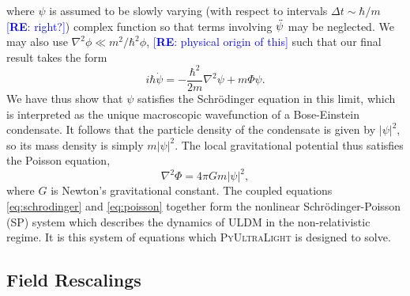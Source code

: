 \documentclass[a4paper,11pt]{article}
\newcommand{\PyUltraLight}{\textsc{PyUltraLight}\xspace}
\newcommand{\re}[1]{\textcolor{blue}{[{\bf RE}: #1]}}
\begin{document}
where $\psi$ is assumed to be slowly varying (with respect to intervals $\Delta t\sim \hbar/m$ \re{right?}) complex function so that terms involving $\Ddot{\psi}$ may be neglected. We may also use $\nabla^2\phi\ll m^2/\hbar^2\phi$, \re{physical origin of this} such that our final result takes the form
\begin{equation}\label{eq:schrodinger}
    i\hbar\Dot{\psi}=-\frac{\hbar^2}{2m}\nabla^2\psi+m\Phi\psi.
\end{equation}
We have thus show that $\psi$ satisfies the Schr{\"o}dinger equation in this limit, which is interpreted as the unique macroscopic wavefunction of a Bose-Einstein condensate. It follows that the particle density of the condensate is given by $\vert\psi\vert^2$, so its mass density is simply $m\vert\psi\vert^2$. The local gravitational potential thus satisfies the Poisson equation,
\begin{equation}\label{eq:poisson}
    \nabla^2\Phi=4\pi G m \vert\psi\vert^2,
\end{equation}
where $G$ is Newton's gravitational constant. The coupled equations \ref{eq:schrodinger} and \ref{eq:poisson} together form the nonlinear Schr{\"o}dinger-Poisson (SP) system which describes the dynamics of ULDM in the non-relativistic regime. It is this system of equations which \PyUltraLight is designed to solve.


\subsection{Field Rescalings}
\end{document}
